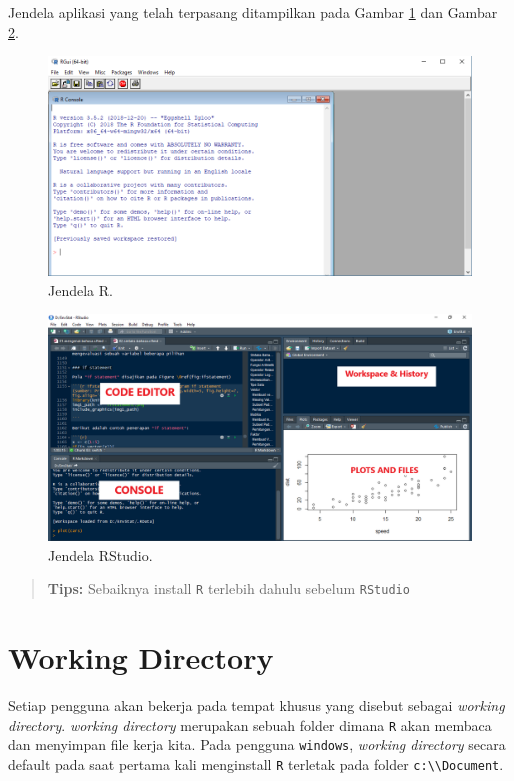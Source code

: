 \documentclass[]{book}
\theoremstyle{definition}
\theoremstyle{definition}
\theoremstyle{definition}
\theoremstyle{remark}
\begin{document}
Jendela aplikasi yang telah terpasang ditampilkan pada Gambar \ref{fig:jendela-R} dan Gambar \ref{fig:jendela-RStudio}.

\begin{figure}

{\centering \includegraphics[width=0.8\linewidth]{./images/jendela_r} 

}

\caption{Jendela R.}\label{fig:jendela-R}
\end{figure}

\begin{figure}

{\centering \includegraphics[width=0.8\linewidth]{./images/jendela_rstudio} 

}

\caption{Jendela RStudio.}\label{fig:jendela-RStudio}
\end{figure}

\begin{quote}
\textbf{Tips:} Sebaiknya install \texttt{R} terlebih dahulu sebelum \texttt{RStudio}
\end{quote}

\hypertarget{wdR}{%
\section{Working Directory}\label{wdR}}

Setiap pengguna akan bekerja pada tempat khusus yang disebut sebagai \emph{working directory}. \emph{working directory} merupakan sebuah folder dimana \texttt{R} akan membaca dan menyimpan file kerja kita. Pada pengguna \texttt{windows}, \emph{working directory} secara default pada saat pertama kali menginstall \texttt{R} terletak pada folder \texttt{c:\textbackslash{}\textbackslash{}Document}.
\end{document}
